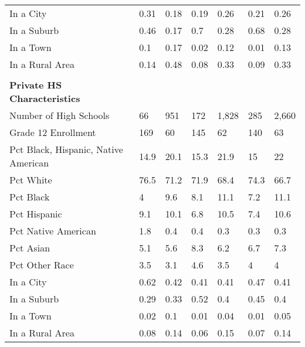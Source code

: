 \begin{longtabu}{X[4.5,l] X[1,c] X[1,c] X[1,c] X[1,c] X[1,c] X[1,c]}
\hspace{0.4cm}In a City&0.31&0.18&0.19&0.26&0.21&0.26\\%
\hspace{0.4cm}In a Suburb&0.46&0.17&0.7&0.28&0.68&0.28\\%
\hspace{0.4cm}In a Town&0.1&0.17&0.02&0.12&0.01&0.13\\%
\hspace{0.4cm}In a Rural Area&0.14&0.48&0.08&0.33&0.09&0.33\\%
&&&&&&\\%
\textbf{Private HS Characteristics}&\textbf{}&\textbf{}&\textbf{}&\textbf{}&\textbf{}&\textbf{}\\%
\hspace{0.4cm}Number of High Schools&66&951&172&1,828&285&2,660\\%
\hspace{0.4cm}Grade 12 Enrollment&169&60&145&62&140&63\\%
\hspace{0.4cm}Pct Black, Hispanic, Native American&14.9&20.1&15.3&21.9&15&22\\%
\hspace{0.4cm}Pct White&76.5&71.2&71.9&68.4&74.3&66.7\\%
\hspace{0.4cm}Pct Black&4&9.6&8.1&11.1&7.2&11.1\\%
\hspace{0.4cm}Pct Hispanic&9.1&10.1&6.8&10.5&7.4&10.6\\%
\hspace{0.4cm}Pct Native American&1.8&0.4&0.4&0.3&0.3&0.3\\%
\hspace{0.4cm}Pct Asian&5.1&5.6&8.3&6.2&6.7&7.3\\%
\hspace{0.4cm}Pct Other Race&3.5&3.1&4.6&3.5&4&4\\%
\hspace{0.4cm}In a City&0.62&0.42&0.41&0.41&0.47&0.41\\%
\hspace{0.4cm}In a Suburb&0.29&0.33&0.52&0.4&0.45&0.4\\%
\hspace{0.4cm}In a Town&0.02&0.1&0.01&0.04&0.01&0.05\\%
\hspace{0.4cm}In a Rural Area&0.08&0.14&0.06&0.15&0.07&0.14\\%
\end{longtabu}
\newpage
